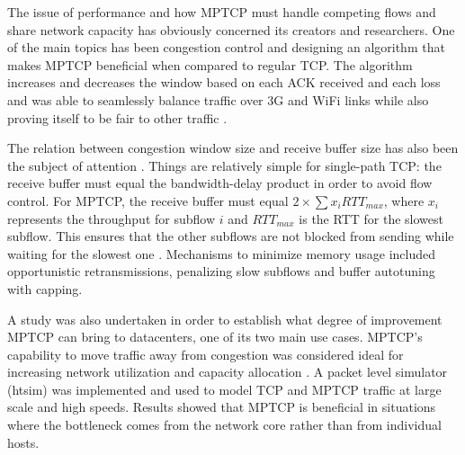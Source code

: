 
The issue of performance and how MPTCP must handle competing flows and share network capacity has obviously concerned its creators and researchers. One of the main topics has been congestion control and designing an algorithm that makes MPTCP beneficial when compared to regular TCP.  The algorithm increases and decreases the window based on each ACK received and each loss and was able to seamlessly balance traffic over 3G and WiFi links while also proving itself to be fair to other traffic \cite{congestion-control}.

The relation between congestion window size and receive buffer size has also
been the subject of attention \cite{how-hard-can-it-be}.  Things are
relatively simple for single-path TCP: the receive buffer must equal the
bandwidth-delay product in order to avoid flow control. For MPTCP, the receive
buffer must equal $2\times\sum x_i RTT_{max}$, where $x_i$  represents the
throughput for subflow $i$ and $RTT_{max}$ is the RTT for the slowest subflow.
This ensures that the other subflows are not blocked from sending while waiting
for the slowest one \cite{how-hard-can-it-be}. Mechanisms to minimize memory
usage included opportunistic retransmissions, penalizing slow subflows and
buffer autotuning with capping.

A study was also undertaken in order to establish what degree of improvement MPTCP can bring to datacenters, one of its two main use cases. MPTCP's capability to move traffic away from congestion was considered ideal for increasing network utilization and capacity allocation \cite{in-datacenters}. A packet level simulator (htsim) was implemented and used to model TCP and MPTCP traffic at large scale and high speeds.  Results showed that MPTCP is beneficial in situations where the bottleneck comes from the network core rather than from individual hosts.
